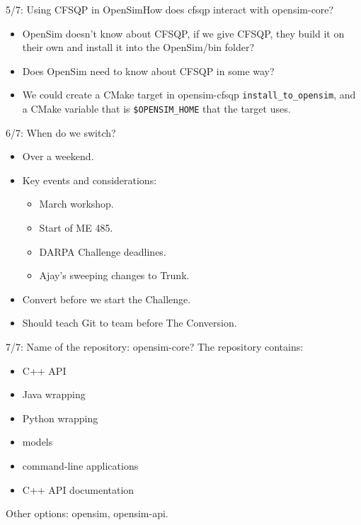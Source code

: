 \documentclass[pdf, 8pt]{beamer}
\def\NUMDECISIONS{7}
\begin{document}
\begin{frame}[fragile]{5/\NUMDECISIONS: Using CFSQP in OpenSim}{How does cfsqp
    interact with opensim-core?}
    \begin{itemize}
        \item OpenSim doesn't know about CFSQP, if we give CFSQP, they
            build it on their own and install it into the OpenSim/bin
            folder?
        \item Does OpenSim need to know about CFSQP in some way?
        \item We could create a CMake target in opensim-cfsqp
            \verb|install_to_opensim|, and a CMake variable that is
            \verb|$OPENSIM_HOME| that the target uses.
    \end{itemize}
\end{frame}

\begin{frame}{6/\NUMDECISIONS: When do we switch?}

\begin{itemize}
\item Over a weekend.
\item Key events and considerations:
\begin{itemize}
\item March workshop.
\item Start of ME 485.
\item DARPA Challenge deadlines.
\item Ajay's sweeping changes to Trunk.
\end{itemize}
\item Convert before we start the Challenge.
\item Should teach Git to team before The Conversion.
\end{itemize}

\end{frame}

\begin{frame}{7/\NUMDECISIONS: Name of the repository: opensim-core?}
The repository contains:
\begin{itemize}
    \item C++ API
    \item Java wrapping
    \item Python wrapping
    \item models
    \item command-line applications
    \item C++ API documentation
\end{itemize}

Other options: opensim, opensim-api.
\end{frame}
\end{document}
